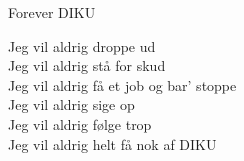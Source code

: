 \begin{song}{Forever DIKU}
  \begin{SBChorus}
    Jeg vil aldrig droppe ud\\
    Jeg vil aldrig stå for skud\\
    Jeg vil aldrig få et job og bar' stoppe\\
    Jeg vil aldrig sige op\\
    Jeg vil aldrig følge trop\\
    Jeg vil aldrig helt få nok af DIKU
  \end{SBChorus}


\end{song}